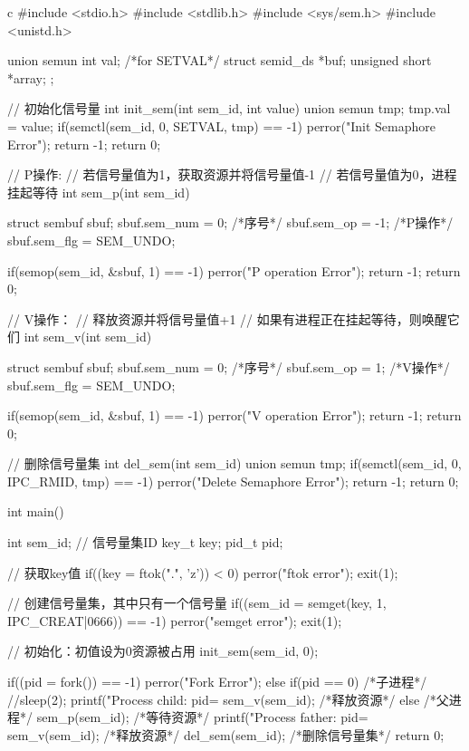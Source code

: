 \begin{code-block}{c}
#include <stdio.h>
#include <stdlib.h>
#include <sys/sem.h>
#include <unistd.h>

union semun
{
        int              val; /*for SETVAL*/
        struct semid_ds *buf;
        unsigned short  *array;
};

// 初始化信号量
int init_sem(int sem_id, int value)
{
        union semun tmp;
        tmp.val = value;
        if(semctl(sem_id, 0, SETVAL, tmp) == -1)
        {
                perror("Init Semaphore Error");
                return -1;
        }
        return 0;
}

// P操作:
//    若信号量值为1，获取资源并将信号量值-1
//    若信号量值为0，进程挂起等待
int sem_p(int sem_id)
{
        struct sembuf sbuf;
        sbuf.sem_num = 0; /*序号*/
        sbuf.sem_op = -1; /*P操作*/
        sbuf.sem_flg = SEM_UNDO;

        if(semop(sem_id, &sbuf, 1) == -1)
        {
                perror("P operation Error");
                return -1;
        }
        return 0;
}

// V操作：
//    释放资源并将信号量值+1
//    如果有进程正在挂起等待，则唤醒它们
int sem_v(int sem_id)
{
        struct sembuf sbuf;
        sbuf.sem_num = 0; /*序号*/
        sbuf.sem_op = 1;  /*V操作*/
        sbuf.sem_flg = SEM_UNDO;

        if(semop(sem_id, &sbuf, 1) == -1)
        {
                perror("V operation Error");
                return -1;
        }
        return 0;
}

// 删除信号量集
int del_sem(int sem_id)
{
        union semun tmp;
        if(semctl(sem_id, 0, IPC_RMID, tmp) == -1)
        {
                perror("Delete Semaphore Error");
                return -1;
        }
        return 0;
}


int main()
{
        int sem_id;  // 信号量集ID
        key_t key;
        pid_t pid;

        // 获取key值
        if((key = ftok(".", 'z')) < 0)
        {
                perror("ftok error");
                exit(1);
        }

        // 创建信号量集，其中只有一个信号量
        if((sem_id = semget(key, 1, IPC_CREAT|0666)) == -1)
        {
                perror("semget error");
                exit(1);
        }

        // 初始化：初值设为0资源被占用
        init_sem(sem_id, 0);

        if((pid = fork()) == -1)
                perror("Fork Error");
        else if(pid == 0) /*子进程*/
        {
                //sleep(2);
                printf("Process child: pid=%
                sem_v(sem_id);  /*释放资源*/
        }
        else  /*父进程*/
        {
                sem_p(sem_id);   /*等待资源*/
                printf("Process father: pid=%
                sem_v(sem_id);   /*释放资源*/
                del_sem(sem_id); /*删除信号量集*/
        }
        return 0;
}
\end{code-block}
